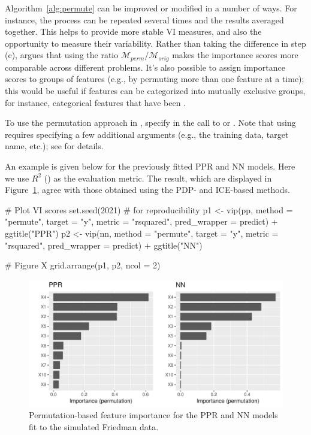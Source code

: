 Algorithm~\ref{alg:permute} can be improved or modified in a number of ways. For instance, the process can be repeated several times and the results averaged together. This helps to provide more stable VI measures, and also the opportunity to measure their variability. Rather than taking the difference in step (c), \citet[Chapter 5, Section 5.5.4]{molnar-2019-iml} argues that using the ratio $\mathcal{M}_{perm} / \mathcal{M}_{orig}$ makes the importance scores more comparable across different problems. It's also possible to assign importance scores to groups of features (e.g., by permuting more than one feature at a time); this would be useful if features can be categorized into mutually exclusive groups, for instance, categorical features that have been .

To use the permutation approach in , specify  in the call to  or . Note that using  requires specifying a few additional arguments (e.g., the training data, target name, etc.); see  for details.

An example is given below for the previously fitted PPR and NN models. Here we use $R^2$ () as the evaluation metric. The result, which are displayed in Figure~\ref{fig:vip-permute-ppr-nn}, agree with those obtained using the PDP- and ICE-based methods.

\begin{example}
# Plot VI scores
set.seed(2021)  # for reproducibility
p1 <- vip(pp, method = "permute", target = "y", metric = "rsquared",
          pred_wrapper = predict) + ggtitle("PPR")
p2 <- vip(nn, method = "permute", target = "y", metric = "rsquared",
          pred_wrapper = predict) + ggtitle("NN")

# Figure X
grid.arrange(p1, p2, ncol = 2)
\end{example}

\begin{figure}[!htb]
  \centering 
  \includegraphics[width=1\linewidth]{figures/vip-permute-ppr-nn} 
  \caption{Permutation-based feature importance for the PPR and NN models fit to the simulated Friedman data.}
  \label{fig:vip-permute-ppr-nn}
\end{figure}

